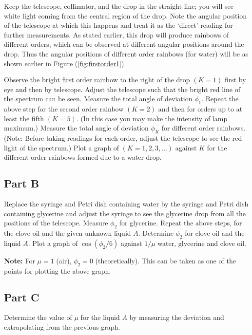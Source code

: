 Keep the telescope, collimator, and the drop in the straight line; you will see white light coming from the central region of the drop. Note the angular position of the telescope at which this happens and treat it as the `direct' reading for further measurements. As stated earlier, this drop will produce rainbows of different orders, which can be observed at different angular positions around the drop. Thus the angular positions of different order rainbows (for water) will be as shown earlier in Figure (\ref{fig:firstorder1}). 

Observe the bright first order rainbow to the right of the drop $(K = 1)$ first by eye and then by telescope. Adjust the telescope such that the bright red line of the spectrum can be seen. Measure the total angle of deviation $\phi_1$. Repeat the above step for the second order rainbow $(K = 2)$ and then for orders up to at least the fifth $(K = 5)$. (In this case you may make the intensity of lamp maximum.) Measure the total angle of deviation $\phi_K$ for different order rainbows. (Note: Before taking readings for each order, adjust the telescope to see the red light of the spectrum.) Plot a graph of  $(K = 1, 2, 3, \hdots)$ against $K$ for the different order rainbows formed due to a water drop.

\subsection*{Part B}
Replace the syringe and Petri dish containing water by the syringe and Petri dish containing glycerine and adjust the syringe to see the glycerine drop from all the positions of the telescope. Measure $\phi_2$ for glycerine. Repeat the above steps, for the clove oil and the given unknown liquid $A$. Determine $\phi_2$ for clove oil and the liquid $A$. Plot a graph of $\cos(\phi_2 / 6)$ against $1/\mu$  water, glycerine and clove oil. 

\begin{imp}
\textbf{Note:} For $\mu = 1$ (air), $\phi_2 = 0$ (theoretically). This can be taken as one of the points for plotting the above graph.
\end{imp}
 

\subsection*{Part C}
Determine the value of $\mu$ for the liquid $A$ by measuring the deviation and extrapolating from the previous graph.



